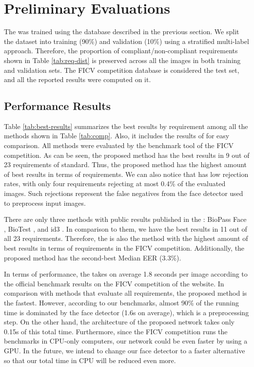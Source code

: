 \section{Preliminary Evaluations} \label{sec:results}

The \methodname was trained using the database described in the previous section. We split the dataset into training (90\%) and validation (10\%) using a stratified multi-label approach. Therefore, the proportion of compliant/non-compliant requirements shown in Table \ref{tab:req-dist} is preserved across all the images in both training and validation sets. The FICV competition database is considered the test set, and all the reported results were computed on it.

\subsection{Performance Results}

Table \ref{tab:best-results} summarizes the best results by requirement among all the methods shown in Table \ref{tab:comp}. Also, it includes the results of \methodname for easy comparison. All methods were evaluated by the benchmark tool of the FICV competition. As can be seen, the proposed method has the best results in 9 out of 23 requirements of \icao standard. Thus, the proposed method has the highest amount of best results in terms of requirements. We can also notice that \methodname has low rejection rates, with only four requirements rejecting at most 0.4\% of the evaluated images. Such rejections represent the false negatives from the face detector used to preprocess input images.



There are only three methods with public results published in the \fvcongoing: BioPass Face \citep{fvcVsoft}, BioTest \citep{fvcBioTest}, and id3 \citep{fvcICAOCompliance}. In comparison to them, we have the best results in 11 out of all 23 requirements. Therefore, the \methodname is also the method with the highest amount of best results in terms of requirements in the FICV competition. Additionally, the proposed method has the second-best Median EER (3.3\%).

In terms of performance, the \methodname takes on average 1.8 seconds per image according to the official benchmark results on the FICV competition of the \fvcongoing website. In comparison with methods that evaluate all requirements, the proposed method is the fastest. However, according to our benchmarks, almost 90\% of the \methodname running time is dominated by the face detector (1.6s on average), which is a preprocessing step. On the other hand, the architecture of the proposed network takes only 0.15s of this total time. Furthermore, since the FICV competition runs the benchmarks in CPU-only computers, our network could be even faster by using a GPU. In the future, we intend to change our face detector to a faster alternative so that our total time in CPU will be reduced even more.

